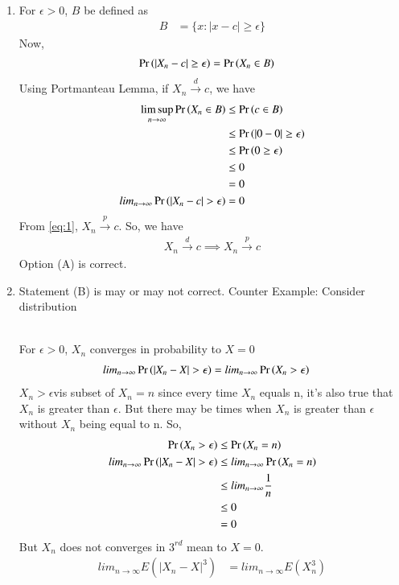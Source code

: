 \documentclass[journal,12pt,twocolumn]{IEEEtran}
\theoremstyle{remark}
\begin{document}
\begin{enumerate}[label=(\Alph*)]
\item For $\epsilon > 0$, $B$ be defined as
\begin{align}
B&=\{x: |x-c| \geq \epsilon\}
\end{align}
Now,
\begin{align}
\Pr\left(|X_n-c| \geq \epsilon\right)&= \Pr\left(X_n \in B\right)
\end{align}
Using Portmanteau Lemma, if $X_n \xrightarrow{d} c$, we have
\begin{align}
\limsup\limits_{n \to \infty}\pr{X_n \in B} & \leq \pr{c \in B}\\
& \leq \pr{|0-0|\geq \epsilon}\\
& \leq \pr{0\geq \epsilon}\\
& \leq 0\\
&=0\\
lim_{n \to \infty} \pr{|X_n-c|>\epsilon}&=0
\end{align}
From \eqref{eq:1}, $X_n \xrightarrow{p} c$. So, we have
\begin{align}
X_n \xrightarrow{d} c \implies X_n \xrightarrow{p} c
\end{align}
Option (A) is correct.
\item Statement (B) is may or may not correct.
Counter Example:
Consider distribution
\begin{table}[!ht]
	
\end{table}\\
For $\epsilon>0$, $X_n$ converges in probability to $X=0$
\begin{align}
lim_{n \to \infty} \pr{|X_n-X|>\epsilon}&=lim_{n \to \infty} \pr{X_n>\epsilon}
\end{align}
$X_n>\epsilon$vis subset of $X_n=n$ since every time $X_n$ equals n, it's also true that $X_n$ is greater than $\epsilon$. But there may be times when $X_n$ is greater than $\epsilon$ without $X_n$ being equal to n. So,
\begin{align}
\pr{X_n>\epsilon}&\leq \pr{X_n=n}\\
lim_{n \to \infty} \pr{|X_n-X|>\epsilon}&\leq lim_{n \to \infty} \pr{X_n=n}\\
&\leq lim_{n \to \infty} \frac{1}{n}\\
& \leq 0\\
&=0
\end{align} 
But $X_n$ does not converges in $3^{rd}$ mean to $X=0$.
\begin{align}
lim_{n \to \infty} E(|X_n-X|^3)&=lim_{n \to \infty} E(X_n^3)\\

\end{align}
\end{enumerate}
\end{document}
